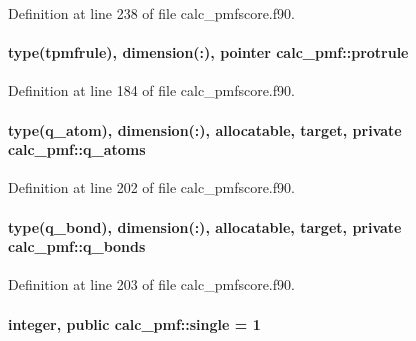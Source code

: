 Definition at line 238 of file calc\-\_\-pmfscore.\-f90.

\hypertarget{classcalc__pmf_a82f61bada0fda64b2e720d7732f8dadc}{
\paragraph[{protrule}]{\setlength{\rightskip}{0pt plus 5cm}type({\bf tpmfrule}), dimension(\-:), pointer calc\-\_\-pmf\-::protrule}}\label{classcalc__pmf_a82f61bada0fda64b2e720d7732f8dadc}


Definition at line 184 of file calc\-\_\-pmfscore.\-f90.

\hypertarget{classcalc__pmf_a0d11c4fd5eac8488b13240eac62a1afa}{
\paragraph[{q\-\_\-atoms}]{\setlength{\rightskip}{0pt plus 5cm}type({\bf q\-\_\-atom}), dimension(\-:), allocatable, target, private calc\-\_\-pmf\-::q\-\_\-atoms\hspace{0.3cm}{\ttfamily [private]}}}\label{classcalc__pmf_a0d11c4fd5eac8488b13240eac62a1afa}


Definition at line 202 of file calc\-\_\-pmfscore.\-f90.

\hypertarget{classcalc__pmf_af9e5c5b8b384db6699d16f3e57547308}{
\paragraph[{q\-\_\-bonds}]{\setlength{\rightskip}{0pt plus 5cm}type({\bf q\-\_\-bond}), dimension(\-:), allocatable, target, private calc\-\_\-pmf\-::q\-\_\-bonds\hspace{0.3cm}{\ttfamily [private]}}}\label{classcalc__pmf_af9e5c5b8b384db6699d16f3e57547308}


Definition at line 203 of file calc\-\_\-pmfscore.\-f90.

\hypertarget{classcalc__pmf_abe3c333d7711e22367752892c04b6f79}{
\paragraph[{single}]{\setlength{\rightskip}{0pt plus 5cm}integer, public calc\-\_\-pmf\-::single = 1}}\label{classcalc__pmf_abe3c333d7711e22367752892c04b6f79}


